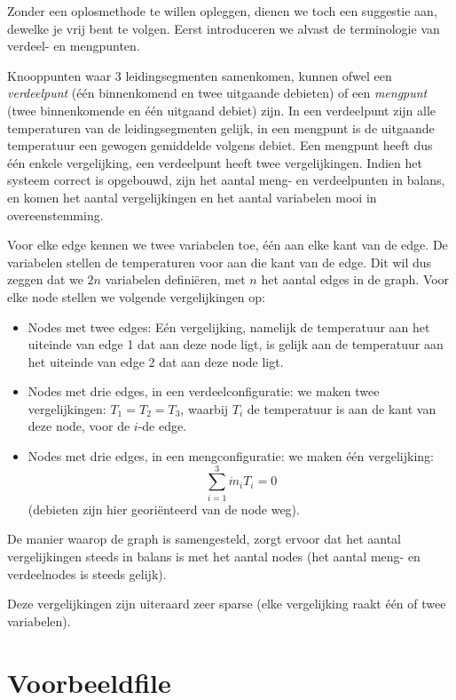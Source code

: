 \documentclass[12pt]{article}
\begin{document}
Zonder een oplosmethode te willen opleggen, dienen we toch een suggestie aan, dewelke je vrij bent te volgen. Eerst introduceren we alvast de terminologie van verdeel- en mengpunten.

Knooppunten waar 3 leidingsegmenten samenkomen, kunnen ofwel een \emph{verdeelpunt} (één binnenkomend en twee uitgaande debieten) of een \emph{mengpunt} (twee binnenkomende en één uitgaand debiet) zijn. In een verdeelpunt zijn alle temperaturen van de leidingsegmenten gelijk, in een mengpunt is de uitgaande temperatuur een gewogen gemiddelde volgens debiet. Een mengpunt heeft dus één enkele vergelijking, een verdeelpunt heeft twee vergelijkingen. Indien het systeem correct is opgebouwd, zijn het aantal meng- en verdeelpunten in balans, en komen het aantal vergelijkingen en het aantal variabelen mooi in overeenstemming.

Voor elke edge kennen we twee variabelen toe, één aan elke kant van de edge. De variabelen stellen de temperaturen voor aan die kant van de edge. Dit wil dus zeggen dat we $2n$ variabelen definiëren, met $n$ het aantal edges in de graph. Voor elke node stellen we volgende vergelijkingen op:
\begin{itemize}
	\item Nodes met twee edges: Eén vergelijking, namelijk de temperatuur aan het uiteinde van edge 1 dat aan deze node ligt, is gelijk aan de temperatuur aan het uiteinde van edge 2 dat aan deze node ligt.
	\item Nodes met drie edges, in een verdeelconfiguratie: we maken twee vergelijkingen: $T_1 = T_2 = T_3$, waarbij $T_i$ de temperatuur is aan de kant van deze node, voor de $i$-de edge.
	\item Nodes met drie edges, in een mengconfiguratie: we maken één vergelijking: 
	\[ \sum_{i=1}^3 \dot{m}_i T_i = 0 \] (debieten zijn hier georiënteerd van de node weg).
\end{itemize}

De manier waarop de graph is samengesteld, zorgt ervoor dat het aantal vergelijkingen steeds in balans is met het aantal nodes (het aantal meng- en verdeelnodes is steeds gelijk).

Deze vergelijkingen zijn uiteraard zeer sparse (elke vergelijking raakt één of twee variabelen).

\section{Voorbeeldfile}
\label{fig:ex}
\end{document}
